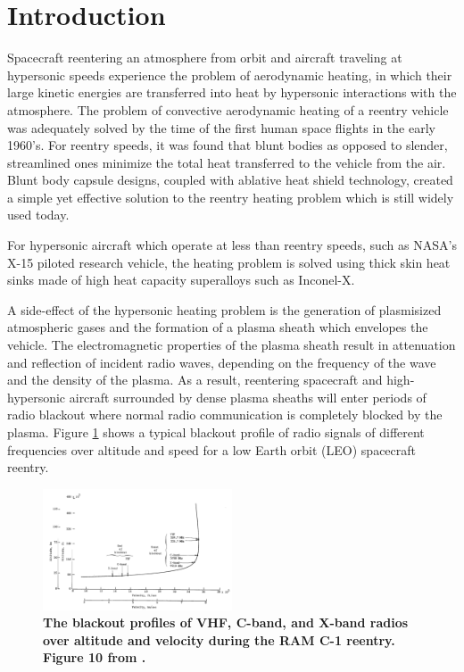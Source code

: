\documentclass[twocolumn]{article}
\begin{document}
\section{Introduction}
	Spacecraft reentering an atmosphere from orbit and aircraft traveling at hypersonic speeds experience the problem of aerodynamic heating, in which their large kinetic energies are transferred into heat by hypersonic interactions with the atmosphere.
	The problem of convective aerodynamic heating of a reentry vehicle was adequately solved by the time of the first human space flights in the early 1960's.
	For reentry speeds, it was found that blunt bodies as opposed to slender, streamlined ones minimize the total heat transferred to the vehicle from the air.\cite{allen_study_1958}
	Blunt body capsule designs, coupled with ablative heat shield technology, created a simple yet effective solution to the reentry heating problem which is still widely used today.
	
	For hypersonic aircraft which operate at less than reentry speeds, such as NASA's X-15 piloted research vehicle, the heating problem is solved using thick skin heat sinks made of high heat capacity superalloys such as Inconel-X.\cite{stillwell_x-15_1965}
	
	A side-effect of the hypersonic heating problem is the generation of plasmisized atmospheric gases and the formation of a plasma sheath which envelopes the vehicle.
	The electromagnetic properties of the plasma sheath result in attenuation and reflection of incident radio waves, depending on the frequency of the wave and the density of the plasma.
	As a result, reentering spacecraft and high-hypersonic aircraft surrounded by dense plasma sheaths will enter periods of radio blackout where normal radio communication is completely blocked by the plasma.
	Figure \ref{fig:RAMCBlackout} shows a typical blackout profile of radio signals of different frequencies over altitude and speed for a low Earth orbit (LEO) spacecraft reentry.
	
	\begin{figure}[h]
		\centering
		\includegraphics[width = 0.5\textwidth]{Images/RAMC_BlackoutProfile.png}
		\caption{\textbf{The blackout profiles of VHF, C-band, and X-band radios over altitude and velocity during the RAM C-1 reentry. Figure 10 from \cite{akey_radio_1970}.}}
		\label{fig:RAMCBlackout}
	\end{figure}
	
\end{document}
